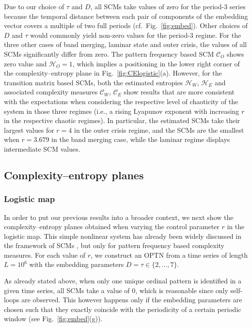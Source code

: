 \documentclass[aip,cha,reprint,nofootinbib]{revtex4-1}
\begin{document}
Due to our choice of $\tau$ and $D$, all SCMs take values of zero for the period-3 series because the temporal distance between each pair of components of the embedding vector covers a multiple of two full periods (cf.~Fig.~\ref{fig:embed}). Other choices of $D$ and $\tau$ would commonly yield non-zero values for the period-3 regime. For the three other cases of band merging, laminar state and outer crisis, the values of all SCMs significantly differ from zero. The pattern frequency based SCM $\mathcal{C}_O$ shows zero value and $\mathcal{H}_{O} = 1$, which implies a positioning in the lower right corner of the complexity--entropy plane in Fig.~\ref{fig:CElogistic}(a). However, for the transition matrix based SCMs, both the estimated entropies $\mathcal{H}_W$, $\mathcal{H}_E$ and associated complexity measures $\mathcal{C}_W$, $\mathcal{C}_E$ show results that are more consistent with the expectations when considering the respective level of chaoticity of the system in those three regimes (i.e., a rising Lyapunov exponent with increasing $r$ in the respective chaotic regimes). In particular, the estimated SCMs take their largest values for $r = 4$ in the outer crisis regime, and the SCMs are the smallest when $r = 3.679$ in the band merging case, while the laminar regime displays intermediate SCM values. 

\subsection{Complexity--entropy planes} \label{sec:plane}
\subsubsection{Logistic map} 
In order to put our previous results into a broader context, we next show the complexity--entropy planes obtained when varying the control parameter $r$ in the logistic map. This simple nonlinear system has already been widely discussed in the framework of SCMs \cite{RossoPRE2007,MartinPLA2003}, but only for pattern frequency based complexity measures. For each value of $r$, we construct an OPTN from a time series of length $L = 10 ^ 6$ with the embedding parameters $D = \tau \in \{2,\ldots,7\}$. 

As already stated above, when only one unique ordinal pattern is identified in a given time series, all SCMs take a value of $0$, which is reasonable since only self-loops are observed. This however happens only if the embedding parameters are chosen such that they exactly coincide with the periodicity of a certain periodic window (see Fig.~\ref{fig:embed}(g)). 
\end{document}
